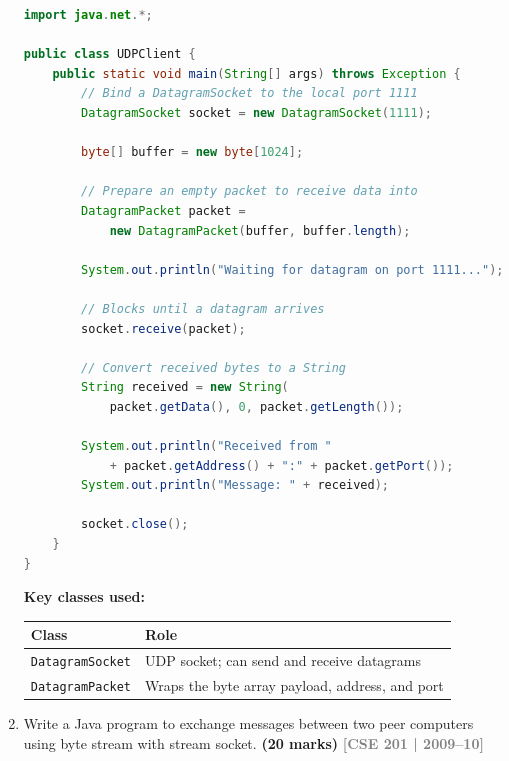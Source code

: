 \documentclass[12pt,a3paper]{article}
\newcommand{\yr}[1]{\hfill\textcolor{gray}{\small\textbf{[#1]}}}
\newcommand{\mk}[1]{\textcolor{orange!70!black}{\small\textbf{(#1 marks)}}}
\begin{document}
\begin{enumerate}
\begin{tcolorbox}[enhanced,breakable,ansbox,
  colback=cB!4,colframe=cB,boxrule=0.8pt,arc=5pt,
  title={\textbf{Answer — Datagram Protocol and UDP Client}},
  fonttitle=\bfseries\color{white},colbacktitle=cB]
\begin{lstlisting}[language=Java]
import java.net.*;

public class UDPClient {
    public static void main(String[] args) throws Exception {
        // Bind a DatagramSocket to the local port 1111
        DatagramSocket socket = new DatagramSocket(1111);

        byte[] buffer = new byte[1024];

        // Prepare an empty packet to receive data into
        DatagramPacket packet =
            new DatagramPacket(buffer, buffer.length);

        System.out.println("Waiting for datagram on port 1111...");

        // Blocks until a datagram arrives
        socket.receive(packet);

        // Convert received bytes to a String
        String received = new String(
            packet.getData(), 0, packet.getLength());

        System.out.println("Received from "
            + packet.getAddress() + ":" + packet.getPort());
        System.out.println("Message: " + received);

        socket.close();
    }
}
\end{lstlisting}

\medskip
\textbf{Key classes used:}

\begin{center}
\small
\begin{tabular}{@{}ll@{}}
\toprule
\textbf{Class} & \textbf{Role} \\
\midrule
\texttt{DatagramSocket} &
  UDP socket; can send and receive datagrams \\
\texttt{DatagramPacket} &
  Wraps the byte array payload, address, and port \\
\bottomrule
\end{tabular}
\end{center}

\end{tcolorbox}

\item Write a Java program to exchange messages between two peer computers using byte stream with stream socket. \mk{20}
\yr{CSE 201 | 2009--10}

\begin{tcolorbox}[enhanced,breakable,ansbox,
  colback=cB!4,colframe=cB,boxrule=0.8pt,arc=5pt,
  title={\textbf{Answer — Byte-Stream Message Exchange
  Between Two Peers}},
  fonttitle=\bfseries\color{white},colbacktitle=cB]


\end{tcolorbox}
\end{enumerate}
\end{document}
